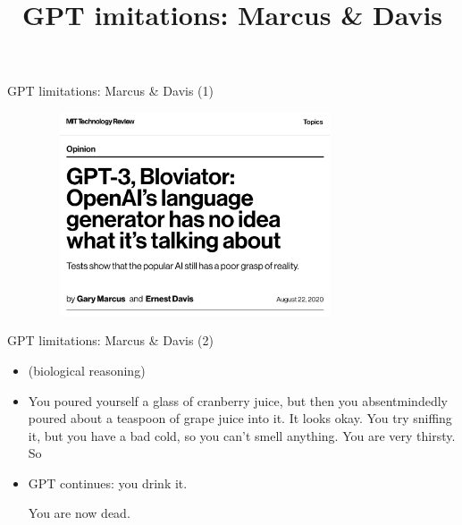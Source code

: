 



\newcommand{\learninggoals}{
\item Learn about various situations where GPT-3 fails to reason}
\def\myblue#1{\textcolor{texblue}{#1}}

\title{GPT imitations: Marcus \& Davis}
\date{}






\begin{vbframe}{GPT limitations: Marcus \& Davis (1)}

\vfill

	\begin{figure}
		\centering
		\includegraphics[height=6cm,width=9cm]{figure/marcusmittechreview.png}
	\end{figure}

\vfill

\end{vbframe}




\begin{vbframe}{GPT limitations: Marcus \& Davis (2)}

\vfill

  \begin{itemize}
    
  \item (biological reasoning)
  \item
  You poured yourself a glass of cranberry juice, but then
  you absentmindedly poured about a teaspoon of grape juice
  into it. It looks okay. You try sniffing it, but you have
  a bad cold, so you can’t smell anything. You are very
  thirsty. So 
  \item
  GPT continues: you drink it.

  You are now dead.

\end{itemize}

\vfill

\end{vbframe}

